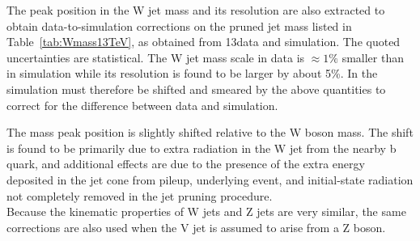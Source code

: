The peak position in the W jet mass and its resolution are also extracted to obtain data-to-simulation corrections on the pruned jet mass listed in Table~\ref{tab:Wmass13TeV}, as obtained from 13\TeV data and simulation. The quoted uncertainties are statistical. The W jet mass scale in data is $\approx1\%$ smaller than in simulation while its resolution is found to be larger by about 5\%.
In the simulation \mJ must therefore be shifted and smeared by the above quantities to correct for the difference between data and simulation.

The mass peak position is slightly shifted relative to the W boson mass. The shift is found to be primarily due to extra radiation in the W jet from the nearby b quark, and additional effects are due to the presence of the extra energy deposited in the jet cone from pileup, underlying event, and initial-state radiation not completely removed in the jet pruning procedure.\\

Because the kinematic properties of W jets and Z jets are very similar, the same corrections are also used when the V jet is assumed to arise from a Z boson.

